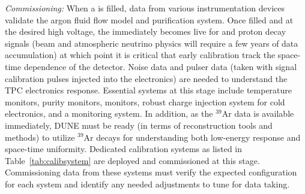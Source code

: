 \textit{Commissioning:} When a  is filled, data from various instrumentation devices validate the argon fluid flow model and purification system. Once filled and at the desired high voltage, the  immediately becomes live for  and proton decay signals (beam and atmospheric neutrino physics will require a few years of data accumulation)
at which point it is critical that early calibration track the space-time dependence of the detector. Noise data 
and pulser data (taken with signal calibration pulses injected into the electronics) are needed to understand the TPC electronics response. Essential systems at this stage include temperature monitors, purity monitors,  monitors, robust  charge injection system for cold electronics, and a  monitoring system. 
In addition, as the $^{39}$Ar data is available immediately, DUNE must be ready (in terms of reconstruction tools and methods) to utilize $^{39}$Ar decays for understanding both low-energy response and space-time uniformity. 
Dedicated calibration systems as listed in Table~\ref{tab:calibsystem} are deployed and commissioned at this stage. Commissioning data from these systems must verify the expected configuration for each system and identify any needed adjustments to tune for data taking.

